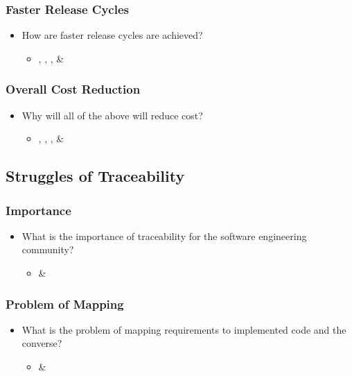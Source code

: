 \documentclass[11pt,a4paper]{article}
\begin{document}
		\subsubsection{Faster Release Cycles}
		\begin{itemize}[noitemsep]
			\item How are faster release cycles are achieved?
			\begin{itemize}
				\item \cite{atkinson_edwards_2018}, \cite{bosch_2014}, \cite{stackify_2018}, \& \cite{stahl_2017} \cite{stackify_2018}
			\end{itemize}
		\end{itemize}
		\subsubsection{Overall Cost Reduction}
		\begin{itemize}[noitemsep]
			\item Why will all of the above will reduce cost?
			\begin{itemize}
				\item \cite{atkinson_edwards_2018}, \cite{bosch_2014}, \cite{stackify_2018}, \& \cite{stahl_2017} \cite{stackify_2018}
			\end{itemize}
		\end{itemize}
		
	\subsection{Struggles of Traceability}
		\subsubsection{Importance}
		\begin{itemize}[noitemsep]
			\item What is the importance of traceability for the software engineering community?
			\begin{itemize}
				\item \cite{stahl_2017} \& \cite{stahl_hallen_bosch_2016}
			\end{itemize}
		\end{itemize}
		\subsubsection{Problem of Mapping}
		\begin{itemize}[noitemsep]
			\item What is the problem of mapping requirements to implemented code and the converse?
			\begin{itemize}
				\item \cite{stahl_2017} \& \cite{stahl_hallen_bosch_2016}
			\end{itemize}
		\end{itemize}
\end{document}
